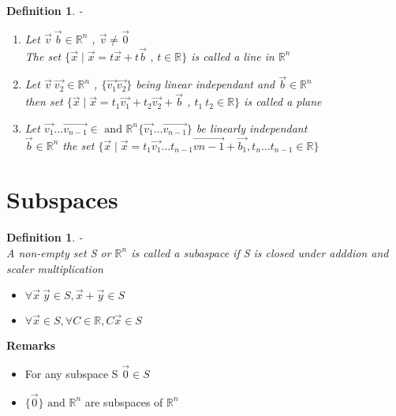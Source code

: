 \documentclass{article}
\newtheorem{definition}[theorem]{Definition}
\begin{document}
\begin{definition} -\\
\begin{enumerate}
\item Let \(\vec{v} \ \vec{b} \in \mathbb{R} ^ n \) , \( \vec{v} \neq \vec{0} \) \\
The set  \(\{ \vec{x} \mid \vec{x} = t\vec{x} + t\vec{b} \text{ , } t \in \mathbb{R} \} \) is called a line in \( \mathbb{R} ^n \)
\item Let \(\vec{v} \ \vec{v_2} \in \mathbb{R} ^ n \) , \( \{ \vec{v_1} \vec{v_2} \} \) being  linear independant  and \(\vec{b} \in \mathbb{R} ^ n \) \\
then set \( \{ \vec{x} \mid \vec{x} = t_1\vec{v_1} + t_2\vec{v_2} + \vec{b} \) , \( t_1 \ t_2 \in \mathbb{R} \} \) is called a plane
\item Let \( \vec{v_1} \ldots \vec{v_{n-1}} \in \text{ and } \mathbb{R}^n  \{ \vec{v_1} \ldots \vec{v_{n-1}}\}\) be linearly independant \\
\( \vec{b} \in \mathbb{R} ^ n \) the set \( \{ \vec{x} \mid \vec{x} = t_1\vec{v_1} \ldots t_{n-1} \vec{v{n-1}} + \vec{b_1}  ,  
t_n \ldots t_{n-1} \in \mathbb{R} \} \)
\end{enumerate}
\end{definition}
\newpage
\section{Subspaces}
\begin{definition} -\\
A non-empty set S or \( \mathbb{R}^n \) is called a subaspace if S is closed under adddion and scaler multiplication
\begin{itemize}
\item \( \forall \vec{x} \ \vec{y} \in S , \vec{x} + \vec{y} \in S \)
\item \( \forall \vec{x} \in S , \forall C \in \mathbb{R} , C\vec{x} \in S \)
\end{itemize}
\end{definition} 

\textbf{Remarks}
\begin{itemize}
\item For any subspace S \( \vec{0} \in S \) 
\item \( \{ \vec{0}\} \text{ and } \mathbb{R}^n \) are subspaces of \( \mathbb{R} ^ n \) 
\end{itemize}
\end{document}
